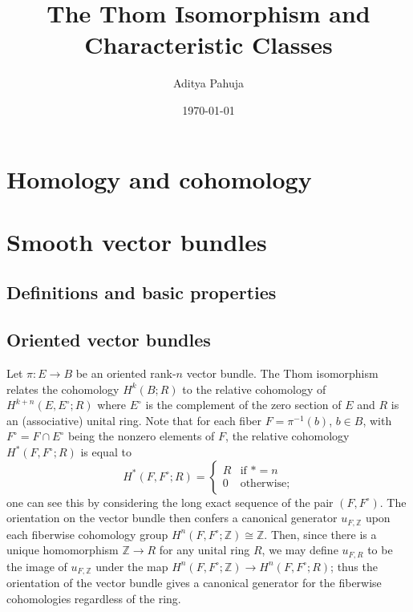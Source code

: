 \documentclass[10pt]{article}
\title{\vspace{-2.0cm}The Thom Isomorphism and Characteristic Classes}
\author{\large Aditya Pahuja}
\date{\large \today}
\providecommand{\ZZ}{\mathbb Z}
\providecommand{\dg}{^\circ}
\providecommand{\inv}{^{-1}}
\begin{document}
\maketitle
\tableofcontents
\pagebreak

\section{Homology and cohomology}

\section{Smooth vector bundles}

\subsection{Definitions and basic properties}

\subsection{Oriented vector bundles}


Let $\pi\colon E\to B$ be an oriented rank-$n$ vector bundle.
The Thom isomorphism relates the cohomology
$H^k(B; R)$ to the relative cohomology of $H^{k+n}(E,E^\circ;  R)$
where $E\dg$ is the complement of the zero section of $E$
and $ R$ is an (associative) unital ring.
Note that for each fiber $F = \pi\inv(b)$, $b\in B$,
with $F\dg = F\cap E\dg$ being the nonzero elements of $F$,
the relative cohomology $H^*(F,F\dg;  R)$ is equal to
\begin{equation*}
    H^*(F,F\dg;  R) = \begin{cases}
	 R & \text{if }* = n\\
	0 & \text{otherwise;}
    \end{cases}
\end{equation*}
one can see this by considering the long exact sequence of the pair $(F,F\dg)$.
The orientation on the vector bundle then confers a
canonical generator $u_{F,\ZZ}$ upon each
fiberwise cohomology group $H^n(F,F\dg;\ZZ)\cong\ZZ$.
Then, since there is a unique homomorphism $\ZZ\to R$
for any unital ring $ R$, we may define $u_{F, R}$
to be the image of $u_{F,\ZZ}$ under the map
$H^n(F,F\dg;\ZZ)\to H^n(F,F\dg; R)$;
thus the orientation of the vector bundle gives a canonical generator
for the fiberwise cohomologies regardless of the ring.

\end{document}
